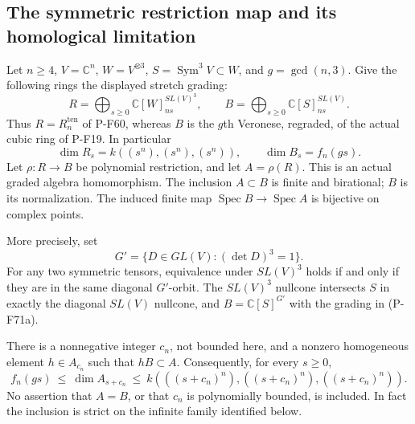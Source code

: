 \subsection{The symmetric restriction map and its homological limitation}

\begin{proposition}
\label{prop:symmetricrestriction}
Let $n\ge4$, $V=\mathbb C^n$, $W=V^{\otimes3}$,
$S=\operatorname{Sym}^3V\subset W$, and $g=\gcd(n,3)$.
Give the following rings the displayed stretch grading:
\[
 R=\bigoplus_{s\ge0}\mathbb C[W]_{ns}^{SL(V)^3},\qquad
 B=\bigoplus_{s\ge0}\mathbb C[S]_{ns}^{SL(V)}.
                                                               \tag{P-F71a}
\]
Thus $R=R_n^{\mathrm{ten}}$ of P-F60, whereas $B$ is the
$g$th Veronese, regraded, of the actual cubic ring of P-F19.
In particular
\[
 \dim R_s=k((s^n),(s^n),(s^n)),\qquad
 \dim B_s=f_n(gs).                                             \tag{P-F71b}
\]
Let $\rho:R\longrightarrow B$ be polynomial restriction,
and let $A=\rho(R)$.  This is an actual graded algebra
homomorphism.  The inclusion $A\subset B$ is finite and
birational; $B$ is its normalization.  The induced finite
map $\operatorname{Spec}B\to\operatorname{Spec}A$ is
bijective on complex points.

More precisely, set
\[
 G'=\{D\in GL(V):(\det D)^3=1\}.
                                                               \tag{P-F71c}
\]
For any two symmetric tensors, equivalence under $SL(V)^3$
holds if and only if they are in the same diagonal $G'$-orbit.
The $SL(V)^3$ nullcone intersects $S$ in exactly the
diagonal $SL(V)$ nullcone, and $B=\mathbb C[S]^{G'}$ with
the grading in (P-F71a).

There is a nonnegative integer $c_n$, not bounded here,
and a nonzero homogeneous element $h\in A_{c_n}$ such that
$hB\subset A$.  Consequently, for every $s\ge0$,
\[
 f_n(gs)\ \le\ \dim A_{s+c_n}\ \le\
              k(((s+c_n)^n),((s+c_n)^n),((s+c_n)^n)).
                                                               \tag{P-F71d}
\]
No assertion that $A=B$, or that $c_n$ is polynomially
bounded, is included.  In fact the inclusion is strict
on the infinite family identified below.
\end{proposition}


